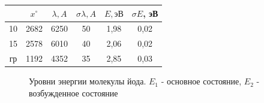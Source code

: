 \documentclass[a4paper,12pt]{article} %
\begin{document}
\begin{itemize}
\begin{table}[h!]
\centering
\begin{tabular}{|c|c|c|c|c|c|}
\hline
 & $x^{\circ}$ & $\lambda, A$ & $\sigma \lambda, A$ & $E, \text{эВ}$ &  $\sigma E$, эВ\\ \hline
10 & 2682 & 6250 & 50 & 1,98 & 0,02 \\ \hline
15 & 2578 & 6010 & 40 & 2,06 & 0,02 \\ \hline
гр & 1192 & 4352 & 35 & 2,85 & 0,03 \\ \hline
\end{tabular}
\end{table}


\end{itemize}


\begin{figure}[h!]
\centering
{}
\caption{Уровни энергии молекулы йода. $E_1$ - основное состояние, $E_2$ - возбужденное состояние}
\label{fig:image}
\end{figure}
\end{document}
